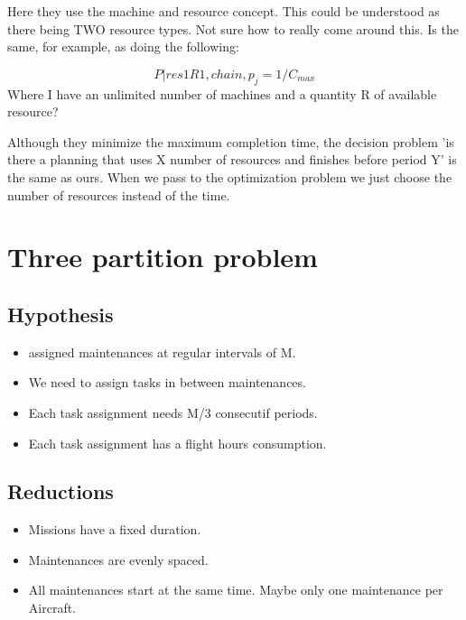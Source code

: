 \documentclass[a4paper,11pt]{article}
\begin{document}
    Here they use the machine and resource concept. This could be understood as there being TWO resource types. Not sure how to really come around this. Is the same, for example, as doing the following:

    $$P| res1R1, chain, p_j = 1 / C_{max}$$ Where I have an unlimited number of machines and a quantity R of available resource?

    Although they minimize the maximum completion time, the decision problem 'is there a planning that uses X number of resources and finishes before period Y' is the same as ours. When we pass to the optimization problem we just choose the number of resources instead of the time.


\clearpage

\section{Three partition problem}


    \subsection{Hypothesis}

    \begin{itemize}
     \item assigned maintenances at regular intervals of M.
     \item We need to assign tasks in between maintenances.
     \item Each task assignment needs M/3 consecutif periods.
     \item Each task assignment has a flight hours consumption.
    \end{itemize}

    \subsection{Reductions}

    \begin{itemize}
        \item Missions have a fixed duration.
        \item Maintenances are evenly spaced.
        \item All maintenances start at the same time. Maybe only one maintenance per Aircraft.
    \end{itemize}
\end{document}
